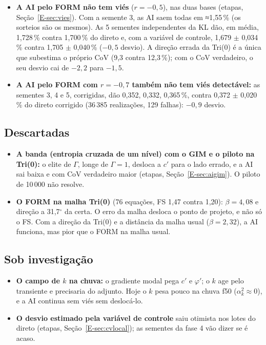 \documentclass[11pt,a4paper]{article}
\begin{document}
\begin{itemize}
    $P_f$ e o mesmo CoV com a mesma semente, nas duas bases (etapas, Seção~\ref{E-sec:aigim}).
  \item \textbf{A AI pelo FORM não tem viés} ($r = -0{,}5$), nas duas bases (etapas, Seção~\ref{E-sec:vies}). Com a semente 3, as AI saem todas em ≈1,55\,\% (os sorteios são os mesmos). As 5 sementes independentes da KL dão, em média, 1{,}728\,\% contra 1{,}700\,\% do direto e, com a variável de controle, 1{,}679 $\pm$ 0{,}034\,\% contra 1{,}705 $\pm$ 0{,}040\,\% ($-0{,}5$ desvio). A direção errada da Tri(0) é a única que subestima o próprio CoV (9{,}3 contra 12{,}3\,\%); com o CoV verdadeiro, o seu desvio cai de $-2{,}2$ para $-1{,}5$.
  \item \textbf{A AI pelo FORM com $r = -0{,}7$ também não tem viés detectável:} as sementes 3, 4 e 5, corrigidas, dão 0{,}352, 0{,}332, 0{,}365\,\%, contra 0{,}372 $\pm$ 0{,}020\,\% do direto corrigido (36\,385 realizações, 129 falhas): $-0{,}9$ desvio.
\end{itemize}
\subsection*{Descartadas}
\begin{itemize}
  \item \textbf{A banda (entropia cruzada de um nível) com o GIM e o piloto na Tri(0):} o elite de $\Gamma$, longe de
    $\Gamma = 1$, desloca a $c'$ para o lado errado, e a AI sai baixa e com CoV verdadeiro maior (etapas,
    Seção~\ref{E-sec:aigim}). O piloto de 10\,000 não resolve.
  \item \textbf{O FORM na malha Tri(0)} (76 equações, FS 1,47 contra 1,20): $\beta = 4{,}08$ e direção a 31,7$^\circ$ da
    certa. O erro da malha desloca o ponto de projeto, e não só o FS. Com a direção da Tri(0) e a distância da malha usual
    ($\beta = 2{,}32$), a AI funciona, mas pior que o FORM na malha usual.
\end{itemize}
\subsection*{Sob investigação}
\begin{itemize}
  \item \textbf{O campo de $k$ na chuva:} o gradiente modal pega $c'$ e $\varphi'$; o $k$ age pelo transiente e
    precisaria do adjunto. Hoje o $k$ pesa pouco na chuva f50 ($\alpha^2_k \approx 0$), e a AI continua sem viés sem
    deslocá-lo.
  \item \textbf{O desvio estimado pela variável de controle} saiu otimista nos lotes do direto (etapas,
    Seção~\ref{E-sec:cvlocal}); as sementes da fase 4 vão dizer se é acaso.
\end{itemize}
\end{document}
